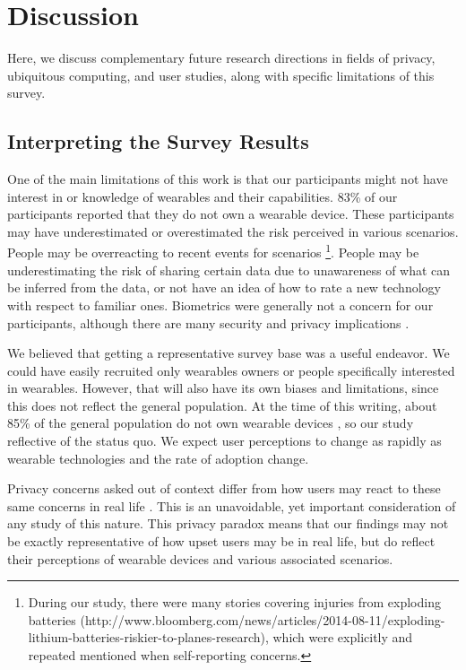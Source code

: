 
\section{Discussion}
Here, we discuss complementary future research directions in fields of privacy, ubiquitous computing, and user studies, along with specific limitations of this survey.

\subsection{Interpreting the Survey Results}
One of the main limitations of this work is that our participants might not have interest in or knowledge of wearables and their capabilities. 83\% of our participants reported that they do not own a wearable device. These participants may have underestimated or overestimated the risk perceived in various scenarios. People may be overreacting to recent events for scenarios \footnote{During our study, there were many stories covering injuries from exploding batteries (http://www.bloomberg.com/news/articles/2014-08-11/exploding-lithium-batteries-riskier-to-planes-research), which were explicitly and repeated mentioned when self-reporting concerns.}. People may be underestimating the risk of sharing certain data due to unawareness of what can be inferred from the data, or not have an idea of how to rate a new technology with respect to familiar ones. Biometrics were generally not a concern for our participants, although there are many security and privacy implications \cite{prabhakar2003biometric}.

We believed that getting a representative survey base was a useful endeavor. We could have easily recruited only wearables owners or people specifically interested in wearables. However, that will also have its own biases and limitations, since this does not reflect the general population. At the time of this writing, about 85\% of the general population do not own wearable devices \cite{Nilsen,WearableStatNews}, so our study reflective of the status quo. We expect user perceptions to change as rapidly as wearable technologies and the rate of adoption change. 

Privacy concerns asked out of context differ from how users may react to these same concerns in real life \cite{norberg2007privacy, jensen2005privacy}. This is an unavoidable, yet important consideration of any study of this nature. This privacy paradox means that our findings may not be exactly representative of how upset users may be in real life, but do reflect their perceptions of wearable devices and various associated scenarios. 

